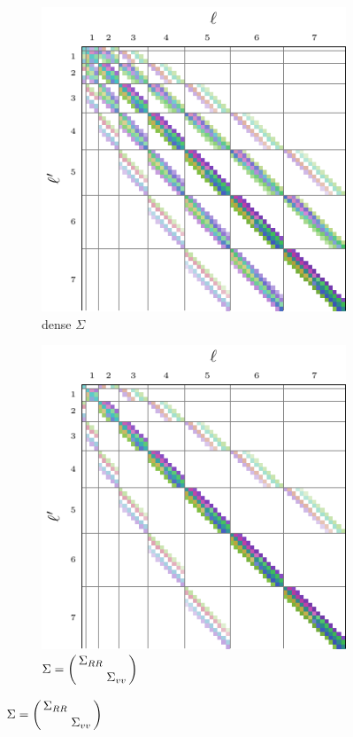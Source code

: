 \documentclass[../../main.tex]{subfiles}
\begin{document}
\begin{refsection}
	\begin{figure}
		\centering
		\begin{subfigure}[b]{0.31\textwidth}
			\centering
			\caption{dense $\Sigma$}
			\includegraphics[width=\textwidth]{Bmat_se3_dense.pdf}
		\end{subfigure}
		\hfill
		\begin{subfigure}[b]{0.31\textwidth}
			\centering
			\caption{$\Sigma = \smqty(\dmat{\Sigma_{RR}, \Sigma_{vv}})$}
			\includegraphics[width=\textwidth]{Bmat_se3_indep.pdf}

\end{subfigure}
\end{figure}
\end{refsection}
\end{document}
